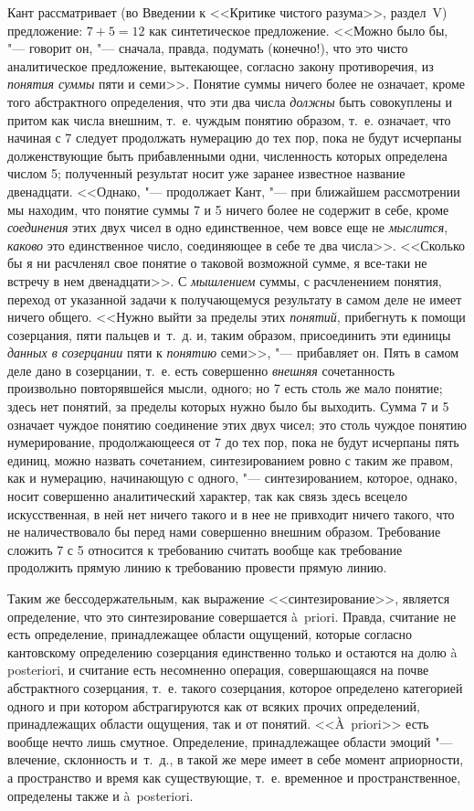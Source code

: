 Кант рассматривает (во Введении к <<Критике чистого разума>>, раздел~V)
предложение: $7 + 5 = 12$ как синтетическое предложение. <<Можно было бы, "---
говорит он, "--- сначала, правда, подумать (конечно!), что это чисто
аналитическое предложение, вытекающее, согласно закону противоречия, из
{\em понятия суммы} пяти и семи>>. Понятие суммы ничего
более не означает, кроме того абстрактного определения, что эти два числа
{\em должны} быть совокуплены и притом как числа
внешним, т.~е. чуждым понятию образом, т.~е. означает, что начиная с 7
следует продолжать нумерацию до тех пор, пока не будут исчерпаны
долженствующие быть прибавленными одни, численность которых определена
числом 5; полученный результат носит уже заранее известное название
двенадцати. <<Однако, "--- продолжает Кант, "--- при ближайшем рассмотрении мы
находим, что понятие суммы 7 и 5 ничего более не содержит в себе, кроме
{\em соединения} этих двух чисел в одно единственное,
чем вовсе еще не {\em мыслится},
{\em каково} это единственное число, соединяющее в себе
те два числа>>. <<Сколько бы я ни расчленял свое понятие о таковой возможной
сумме, я все-таки не встречу в нем двенадцати>>. С
{\em мышлением} суммы, с расчленением понятия, переход
от указанной задачи к получающемуся результату в самом деле не имеет ничего
общего. <<Нужно выйти за пределы этих {\em понятий},
прибегнуть к помощи созерцания, пяти пальцев и~т.~д. и, таким образом,
присоединить эти единицы {\em данных в созерцании} пяти
к {\em понятию} семи>>, "--- прибавляет он. Пять в самом
деле дано в созерцании, т.~е. есть совершенно
{\em внешняя} сочетанность произвольно повторявшейся
мысли, одного; но 7 есть столь же мало понятие; здесь нет понятий, за
пределы которых нужно было бы выходить. Сумма 7 и 5 означает чуждое понятию
соединение этих двух чисел; это столь чуждое понятию нумерирование,
продолжающееся от 7 до тех пор, пока не будут исчерпаны пять единиц, можно
назвать сочетанием, синтезированием ровно с таким же правом, как и
нумерацию, начинающую с одного, "--- синтезированием, которое, однако, носит
совершенно аналитический характер, так как связь здесь всецело
искусственная, в ней нет ничего такого и в нее не привходит ничего такого,
что не наличествовало бы перед нами совершенно внешним образом. Требование
сложить 7 с 5 относится к требованию считать вообще как требование
продолжить прямую линию к требованию провести прямую линию.

Таким же бессодержательным, как выражение <<синтезирование>>, является
определение, что это синтезирование совершается à~priori. Правда, считание
не есть определение, принадлежащее области ощущений, которые согласно
кантовскому определению созерцания единственно только и остаются на долю à
posteriori, и считание есть несомненно операция, совершающаяся на почве
абстрактного созерцания, т.~е. такого созерцания, которое определено
категорией одного и при котором абстрагируются как от всяких прочих
определений, принадлежащих области ощущения, так и от понятий. <<À~priori>>
есть вообще нечто лишь смутное. Определение, принадлежащее области эмоций
"--- влечение, склонность и~т.~д., в такой же мере имеет в себе момент
априорности, а пространство и время как существующие, т.~е. временное и
пространственное, определены также и à~posteriori.

